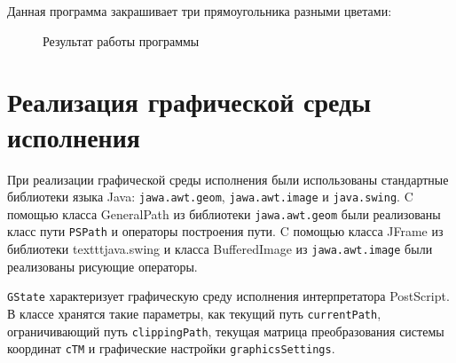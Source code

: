 Данная программа закрашивает три прямоугольника разными цветами: 

\begin{figure}[t]
\caption{Результат работы программы}\label{pic_Rect}
\end{figure}

\section{Реализация графической среды исполнения}
\sloppy

При реализации графической среды исполнения были использованы стандартные библиотеки языка Java: \texttt{jawa.awt.geom}, \texttt{jawa.awt.image} и \texttt{java.swing}. C помощью класса GeneralPath из библиотеки \texttt{jawa.awt.geom} были реализованы класс пути \texttt{PSPath} и операторы построения пути. C помощью класса JFrame из библиотеки texttt{java.swing} и класса BufferedImage из \texttt{jawa.awt.image} были реализованы рисующие операторы.

\texttt{GState} характеризует графическую среду исполнения интерпретатора PostScript. В классе хранятся такие параметры, как текущий путь \texttt{currentPath}, ограничивающий путь \texttt{clippingPath}, текущая матрица преобразования системы координат \texttt{cTM} и графические настройки \texttt{graphicsSettings}.

